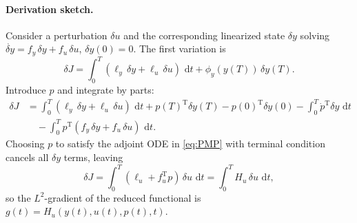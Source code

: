 \documentclass[11pt,a4paper]{article}
\numberwithin{equation}{section}
\theoremstyle{plain}
\theoremstyle{definition}
\newcommand{\td}{\,\mathrm{d}}
\newcommand{\T}{\mathrm{T}}
\begin{document}
\paragraph{Derivation sketch.} Consider a perturbation $\delta u$ and the corresponding linearized state $\delta y$ solving $\dot{\delta y}=f_y\,\delta y+f_u\,\delta u$, $\delta y(0)=0$. The first variation is
\begin{equation}
\delta J = \int_0^T (\ell_y\,\delta y + \ell_u\,\delta u)\,\td t + \phi_y(y(T))\,\delta y(T).
\end{equation}
Introduce $p$ and integrate by parts:
\begin{align}
\delta J &= \int_0^T (\ell_y\,\delta y + \ell_u\,\delta u)\,\td t + p(T)^\T\delta y(T) - p(0)^\T\delta y(0) - \int_0^T \dot p^\T\delta y\,\td t \\
&\quad - \int_0^T p^\T(f_y\,\delta y + f_u\,\delta u)\,\td t.
\end{align}
Choosing $p$ to satisfy the adjoint ODE in \eqref{eq:PMP} with terminal condition cancels all $\delta y$ terms, leaving
\begin{equation}
\delta J = \int_0^T (\ell_u + f_u^\T p)\,\delta u\,\td t = \int_0^T H_u\,\delta u\,\td t,
\end{equation}
so the $L^2$-gradient of the reduced functional is $g(t)=H_u(y(t),u(t),p(t),t)$.
\end{document}
